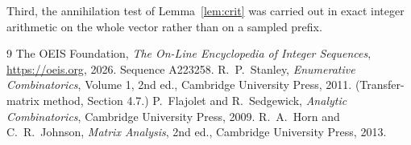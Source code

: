 \documentclass[11pt,a4paper]{article}
\theoremstyle{plain}
\theoremstyle{definition}
\begin{document}
Third, the annihilation test of Lemma~\ref{lem:crit} was carried out in exact integer
arithmetic on the whole vector rather than on a sampled prefix.

\begin{thebibliography}{9}
 The OEIS Foundation, \emph{The On-Line Encyclopedia of Integer
Sequences}, \url{https://oeis.org}, 2026. Sequence A223258.
 R.~P.~Stanley, \emph{Enumerative Combinatorics}, Volume 1, 2nd ed.,
Cambridge University Press, 2011. (Transfer-matrix method, Section 4.7.)
 P.~Flajolet and R.~Sedgewick, \emph{Analytic Combinatorics}, Cambridge
University Press, 2009.
 R.~A.~Horn and C.~R.~Johnson, \emph{Matrix Analysis}, 2nd ed., Cambridge
University Press, 2013.
\end{thebibliography}
\end{document}
